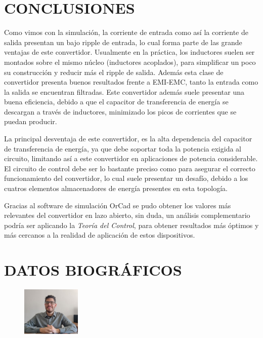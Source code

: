 \documentclass[conference]{IEEEtran}
\begin{document}
\section{CONCLUSIONES}
Como vimos con la simulación, la corriente de entrada como así la corriente de salida presentan un bajo ripple de entrada, lo cual forma parte de las grande ventajas de este convertidor. Usualmente en la práctica, los inductores suelen ser montados sobre el mismo núcleo (inductores acoplados), para simplificar un poco su construcción y reducir más el ripple de salida. Además esta clase de convertidor presenta buenos resultados frente a EMI-EMC, tanto la entrada como la salida se encuentran filtradas. Este convertidor además suele presentar una buena eficiencia, debido a que el capacitor de transferencia de energía se descargan a través de inductores, minimizado los picos de corrientes que se puedan producir.

La principal desventaja de este convertidor, es la alta dependencia del capacitor de transferencia de energía, ya que debe soportar toda la potencia exigida al circuito, limitando así a este convertidor en aplicaciones de potencia considerable. El circuito de control debe ser lo bastante preciso como para asegurar el correcto funcionamiento del convertidor, lo cual suele presentar un desafío, debido a los cuatros elementos almacenadores de energía presentes en esta topología.


Gracias al software de simulación OrCad se pudo obtener los valores más relevantes del convertidor en lazo abierto, sin duda, un análisis complementario podría ser aplicando la \textit{Teoría del Control}, para obtener resultados más óptimos y más cercanos a la realidad de aplicación de estos dispositivos.
\\
\begin{thebibliography}{00}
    
\end{thebibliography}

\section{DATOS BIOGRÁFICOS}
\begin{figure} %
    \centering
    \includegraphics[width=0.25\textwidth]{imagenes/foto paper.jpg}
\end{figure}
\end{document}
